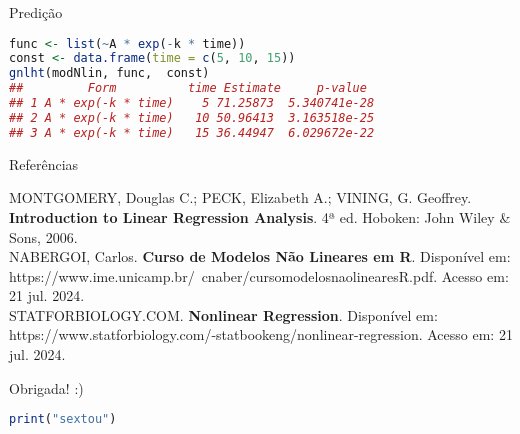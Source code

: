 \documentclass[xcolor=dvipsnames]{beamer}
\begin{document}
        \begin{frame}[fragile]{Predição}
           \begin{lstlisting}[language=R]
func <- list(~A * exp(-k * time))
const <- data.frame(time = c(5, 10, 15)) 
gnlht(modNlin, func,  const)
##         Form          time Estimate     p-value
## 1 A * exp(-k * time)    5 71.25873  5.340741e-28
## 2 A * exp(-k * time)   10 50.96413  3.163518e-25
## 3 A * exp(-k * time)   15 36.44947  6.029672e-22
           \end{lstlisting}         
        \end{frame}

         \begin{frame}{Referências}
         
MONTGOMERY, Douglas C.; PECK, Elizabeth A.; VINING, G. Geoffrey. \textbf{Introduction to Linear Regression Analysis}. 4ª ed. Hoboken: John Wiley & Sons, 2006.\\

\vspace{0.5cm}
NABERGOI, Carlos. \textbf{Curso de Modelos Não Lineares em R}. Disponível em: https://www.ime.unicamp.br/~cnaber/cursomodelosnaolinearesR.pdf. Acesso em: 21 jul. 2024.\\

\vspace{0.5cm}
STATFORBIOLOGY.COM. \textbf{Nonlinear Regression}. Disponível em: https://www.statforbiology.com/-statbookeng/nonlinear-regression. Acesso em: 21 jul. 2024.        
         \end{frame}

         \begin{frame}[fragile]{}

    \hspace{2cm}     Obrigada! :)
    \vspace{1.5cm}
           \begin{lstlisting}[language=R]
               print("sextou")
           \end{lstlisting}
        \end{frame}

      
	
	

        
\end{document}
